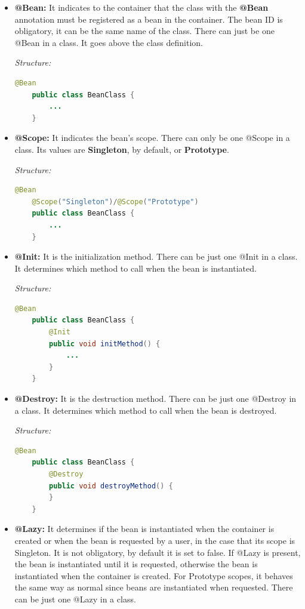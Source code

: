 \documentclass[a4paper, 12pt, notitlepage]{report}
\begin{document}
\begin{itemize}
    \item \textbf{@Bean:} It indicates to the container that the class with the \textbf{@Bean} annotation must be registered as a bean in the container. The bean ID is obligatory, it can be the same name of the class. There can just be one @Bean in a class. It goes above the class definition.
    
    \textit{Structure:}
    \begin{lstlisting}[numbers = none, language = Java]
    @Bean
    public class BeanClass {
        ...
    }
    \end{lstlisting}
    
    \item \textbf{@Scope:} It indicates the bean's scope. There can only be one @Scope in a class. Its values are \textbf{Singleton}, by default, or \textbf{Prototype}.
    
    \textit{Structure:}
    \begin{lstlisting}[numbers = none, language = Java]
    @Bean
    @Scope("Singleton")/@Scope("Prototype")
    public class BeanClass {
    	...
    }

    \end{lstlisting}
    
    \item \textbf{@Init:} It is the initialization method. There can be just one @Init in a class. It determines which method to call when the bean is instantiated.
    
    \textit{Structure:}
    \begin{lstlisting}[numbers = none, language = Java]
    @Bean
    public class BeanClass {
        @Init
        public void initMethod() {
            ...
        }
    }

    \end{lstlisting}
    \item \textbf{@Destroy:} It is the destruction method. There can be just one @Destroy in a class. It determines which method to call when the bean is destroyed. 
    
    \textit{Structure:}
    \begin{lstlisting}[numbers = none, language = Java]
    @Bean
    public class BeanClass {
        @Destroy
        public void destroyMethod() {
        }
    }
    \end{lstlisting}  
    
    \item \textbf{@Lazy:} It determines if the bean is instantiated when the container is created or when the bean is requested by a user, in the case that its scope is Singleton. It is not obligatory, by default it is set to false. If @Lazy is present, the bean is instantiated until it is requested, otherwise the bean is instantiated when the container is created. For Prototype scopes, it behaves the same way as normal since beans are instantiated when requested. There can be just one @Lazy in a class.
    

\end{itemize}
\end{document}
